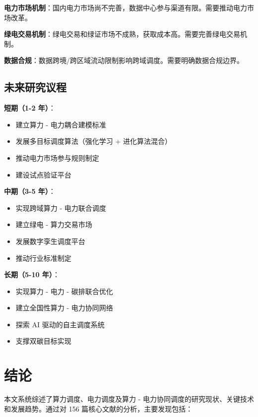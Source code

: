 \documentclass[12pt,a4paper]{article}
\begin{document}
\textbf{电力市场机制}：国内电力市场尚不完善，数据中心参与渠道有限。需要推动电力市场改革。

\textbf{绿电交易机制}：绿电交易和绿证市场不成熟，获取成本高。需要完善绿电交易机制。

\textbf{数据合规}：数据跨境/跨区域流动限制影响跨域调度。需要明确数据合规边界。

\subsection{未来研究议程}

\textbf{短期（1-2 年）}：
\begin{itemize}
    \item 建立算力 - 电力耦合建模标准
    \item 发展多目标调度算法（强化学习 + 进化算法混合）
    \item 推动电力市场参与规则制定
    \item 建设试点验证平台
\end{itemize}

\textbf{中期（3-5 年）}：
\begin{itemize}
    \item 实现跨域算力 - 电力联合调度
    \item 建立绿电 - 算力交易市场
    \item 发展数字孪生调度平台
    \item 推动行业标准制定
\end{itemize}

\textbf{长期（5-10 年）}：
\begin{itemize}
    \item 实现算力 - 电力 - 碳排联合优化
    \item 建立全国性算力 - 电力协同网络
    \item 探索 AI 驱动的自主调度系统
    \item 支撑双碳目标实现
\end{itemize}

\section{结论}
\label{sec:conclusion}

本文系统综述了算力调度、电力调度及算力 - 电力协同调度的研究现状、关键技术和发展趋势。通过对 156 篇核心文献的分析，主要发现包括：
\end{document}
